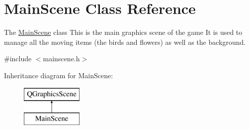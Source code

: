 \hypertarget{class_main_scene}{}\section{Main\+Scene Class Reference}
\label{class_main_scene}


The \hyperlink{class_main_scene}{Main\+Scene} class This is the main graphics scene of the game It is used to manage all the moving items (the birds and flowers) as well as the background.  




{\ttfamily \#include $<$mainscene.\+h$>$}

Inheritance diagram for Main\+Scene\+:\begin{figure}[H]
\begin{center}
\leavevmode
\includegraphics[height=2.000000cm]{class_main_scene}
\end{center}
\end{figure}
